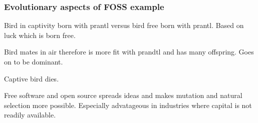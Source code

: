 \documentclass{beamer}
\begin{document}

\begin{frame}
\frametitle{Evolutionary aspects of FOSS example}
Bird in captivity born with prantl versus bird free born with prantl. Based on luck which is born free.

Bird mates in air therefore is more fit with prandtl and has many offspring. Goes on to be dominant. 

Captive bird dies.


Free software and open source spreads ideas and makes mutation and natural selection more possible. Especially advatageous in industries where capital is not readily available.
\end{frame}
\end{document}
